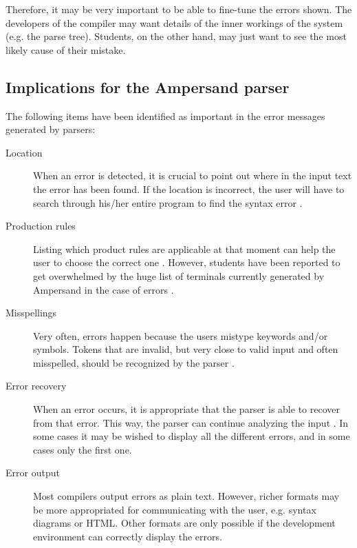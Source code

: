 Therefore, it may be very important to be able to fine-tune the errors shown.
The developers of the compiler may want details of the inner workings of the system (e.g. the parse tree).
Students, on the other hand, may just want to see the most likely cause of their mistake.

\subsection{Implications for the Ampersand parser}
\label{subsec:errors-ampersand}
The following items have been identified as important in the error messages generated by parsers:
\begin{description}
	\item[Location] When an error is detected, it is crucial to point out where in the input text the error has been found.
		If the location is incorrect, the user will have to search through his/her entire program to find the syntax error .
  \item[Production rules] Listing which product rules are applicable at that moment can help the user to choose the correct one .
		However, students have been reported to get overwhelmed by the huge list of terminals currently generated by Ampersand in the case of errors . 
	\item[Misspellings] Very often, errors happen because the users mistype keywords and/or symbols.
		Tokens that are invalid, but very close to valid input and often misspelled, should be recognized by the parser .
	\item[Error recovery] When an error occurs, it is appropriate that the parser is able to recover from that error.
		This way, the parser can continue analyzing the input .
		In some cases it may be wished to display all the different errors, and in some cases only the first one.
	\item[Error output] Most compilers output errors as plain text.
		However, richer formats may be more appropriated for communicating with the user, e.g. syntax diagrams or HTML.
		Other formats are only possible if the development environment can correctly display the errors.
\end{description}
